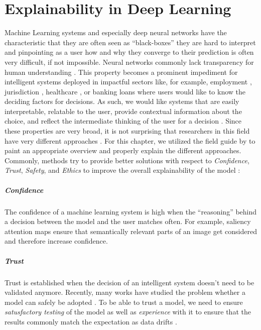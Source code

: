 \chapter{Explainability in Deep Learning} 
\label{sec:Explainability} 

Machine Learning systems and especially deep neural networks have the characteristic that they are often seen as ``black-boxes'' \ie they are hard to interpret and pinpointing as a user how and why they converge to their prediction is often very difficult, if not impossible. Neural networks commonly lack transparency for human understanding \citep{sun2020fixing}. This property becomes a prominent impediment for intelligent systems deployed in impactful sectors like, for example, employment \citep{QinZXZJCX18, CaiSJLQXZ20, ZhaoHCFZ18}, jurisdiction \citep{GuoHQX019}, healthcare \citep{Pasa2019}, or banking loans where users would like to know the deciding factors for decisions. As such, we would like systems that are easily interpretable, relatable to the user, provide contextual information about the choice, and reflect the intermediate thinking of the user for a decision \citep{xie2020explainable}. Since these properties are very broad, it is not surprising that researchers in this field have very different approaches \citep{xie2020explainable}. For this chapter, we utilized the field guide by \citet{xie2020explainable} to paint an appropriate overview and properly explain the different approaches. Commonly, methods try to provide better solutions with respect to \emph{Confidence}, \emph{Trust}, \emph{Safety}, and \emph{Ethics} to improve the overall explainability of the model \citep{xie2020explainable}:

\paragraph{Confidence}
The confidence of a machine learning system is high when the ``reasoning'' behind a decision between the model and the user matches often. For example, saliency attention maps \citep{ParkHARSDR18, HudsonM18} ensure that semantically relevant parts of an image get considered and therefore increase confidence.

\paragraph{Trust} 
Trust is established when the decision of an intelligent system doesn't need to be validated anymore. Recently, many works have studied the problem whether a model can safely be adopted \citep{GharibLBADB18, VarshneyA17, JiangKGG18}. To be able to trust a model, we need to ensure \emph{satusfactory testing} of the model as well as \emph{experience} with it to ensure that the results commonly match the expectation as data drifts \citep{xie2020explainable}.

